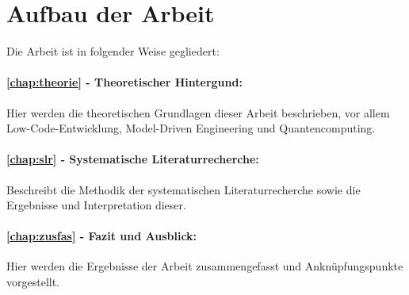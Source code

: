 

\section*{Aufbau der Arbeit}

Die Arbeit ist in folgender Weise gegliedert:
\paragraph{\cref{chap:theorie} - Theoretischer Hintergund:} Hier werden die theoretischen Grundlagen dieser Arbeit beschrieben, vor 
allem Low-Code-Entwicklung, Model-Driven Engineering und Quantencomputing.
\paragraph{\cref{chap:slr} - Systematische Literaturrecherche:} Beschreibt die Methodik der systematischen Literaturrecherche sowie die Ergebnisse 
und Interpretation dieser.
\paragraph{\cref{chap:zusfas} - Fazit und Ausblick:} Hier werden die Ergebnisse der Arbeit zusammengefasst und Anknüpfungspunkte vorgestellt.
